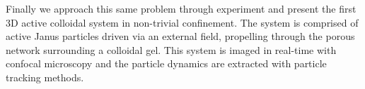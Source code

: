 \begin{SingleSpace}
Finally we approach this same problem through experiment and present the first 3D active colloidal system in non-trivial confinement. The system is comprised of active Janus particles driven via an external field, propelling through the porous network surrounding a colloidal gel. 
 This system is imaged in real-time with confocal microscopy and the particle dynamics are extracted with particle tracking methods. 



\end{SingleSpace}
\clearpage